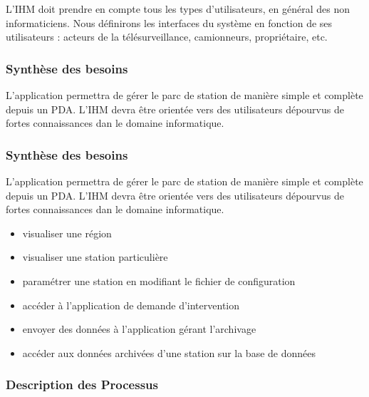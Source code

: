L'IHM doit prendre en compte tous les types d'utilisateurs, en général des non informaticiens. 
Nous définirons les interfaces du système en fonction de ses utilisateurs : 
acteurs de la télésurveillance, camionneurs, propriétaire, etc.
 
\subsubsection{Synthèse des besoins}
L'application permettra de gérer le parc de station de manière simple et complète depuis un PDA. 
L'IHM devra être orientée vers des utilisateurs dépourvus de fortes connaissances dan le domaine informatique.\\

\subsubsection{Synthèse des besoins}
L'application permettra de gérer le parc de station de manière simple et complète depuis un PDA. L'IHM devra être orientée vers des utilisateurs dépourvus de fortes connaissances dan le domaine informatique.\\


\begin{itemize}
\item   visualiser une région 
\item	visualiser une station particulière 
\item	paramétrer une station en modifiant le fichier de configuration 
\item	accéder à l'application de demande d'intervention 
\item	envoyer des données à l'application gérant l'archivage 
\item	accéder aux données archivées d'une station sur la base de données
\end{itemize}


\subsubsection{Description des Processus}

